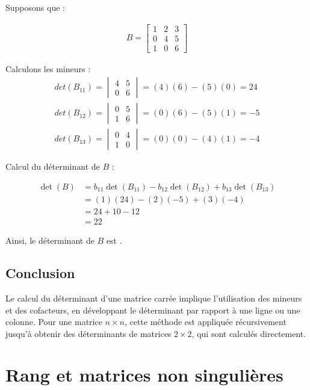 \documentclass{report}
\begin{document}
\begin{multicols*}{2}
Supposons que :

\begin{align*}
    B = \begin{bmatrix}
        1 & 2 & 3 \\
        0 & 4 & 5 \\
        1 & 0 & 6
    \end{bmatrix}
\end{align*}

\noindent
Calculons les mineurs :
\begin{align*}
det(B_{11}) = \begin{vmatrix} 4 & 5 \\ 0 & 6 \end{vmatrix} = (4)(6) - (5)(0) = 24 \\ 
det(B_{12}) = \begin{vmatrix} 0 & 5 \\ 1 & 6 \end{vmatrix} = (0)(6) - (5)(1) = -5 \\ 
det(B_{13}) = \begin{vmatrix} 0 & 4 \\ 1 & 0 \end{vmatrix} = (0)(0) - (4)(1) = -4 
\end{align*}

\noindent
Calcul du déterminant de $B$ :

\begin{align*}
    \det(B) &= b_{11} \det(B_{11}) - b_{12} \det(B_{12}) + b_{13} \det(B_{13}) \\
            &= (1)(24) - (2)(-5) + (3)(-4) \\
            &= 24 + 10 - 12 \\
            &= 22
\end{align*}

Ainsi, le déterminant de $B$ est .

\subsection{Conclusion}

Le calcul du déterminant d'une matrice carrée implique l'utilisation des mineurs et des cofacteurs, en développant le déterminant par rapport à une ligne ou une colonne. Pour une matrice $n \times n$, cette méthode est appliquée récursivement jusqu'à obtenir des déterminants de matrices $2 \times 2$, qui sont calculés directement.

\section{Rang et matrices non singulières}


\end{multicols*}
\end{document}
